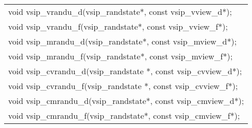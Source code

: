 \begin{table}[h]
\begin{tabular}[H]{|l|}
\hline
void vsip\_vrandu\_d(vsip\_randstate*, const vsip\_vview\_d*);\\
void vsip\_vrandu\_f(vsip\_randstate*, const vsip\_vview\_f*);\\
void vsip\_mrandu\_d(vsip\_randstate*, const vsip\_mview\_d*);\\
void vsip\_mrandu\_f(vsip\_randstate*, const vsip\_mview\_f*);\\
void vsip\_cvrandu\_d(vsip\_randstate *, const vsip\_cvview\_d*);\\
void vsip\_cvrandu\_f(vsip\_randstate *, const vsip\_cvview\_f*);\\
void vsip\_cmrandu\_d(vsip\_randstate*, const vsip\_cmview\_d*);\\
void vsip\_cmrandu\_f(vsip\_randstate*, const vsip\_cmview\_f*);\\
\hline
\end{tabular}
\end{table}
\\\pyjvsiph
